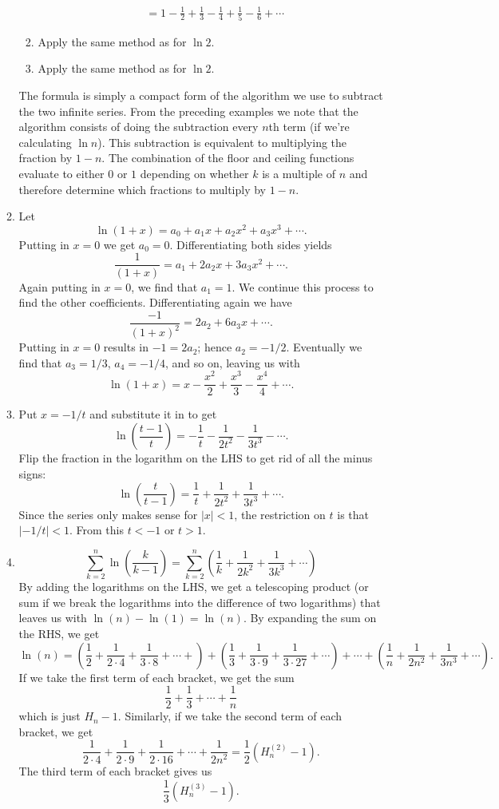 \documentclass[a4paper,10pt]{article}
\begin{document}
\begin{enumerate}
\begin{enumerate}
\begin{enumerate}
\[\begin{split}
                &=1-\frac{1}{2}+\frac{1}{3}-\frac{1}{4}+\frac{1}{5}-\frac{1}{6}+\cdots
        \end{split}
      \]
    \item Apply the same method as for \(\ln2\).
    \item Apply the same method as for \(\ln2\).
    \end{enumerate}
    The formula is simply a compact form of the algorithm we use to subtract the two infinite series. From the preceding examples
    we note that the algorithm consists of doing the subtraction every \(n\)th term (if we're calculating \(\ln n\)). This subtraction
    is equivalent to multiplying the fraction by \(1-n\). The combination of the floor and ceiling functions evaluate to either \(0\) or \(1\)
    depending on whether \(k\) is a multiple of \(n\) and therefore determine which fractions to multiply by \(1-n\).
  \item Let \[\ln(1+x)=a_0+a_1x+a_2x^2+a_3x^3+\cdots.\]
    Putting in \(x=0\) we get \(a_0=0\). Differentiating both sides yields \[\frac{1}{(1+x)}=a_1+2a_2x+3a_3x^2+\cdots.\]
    Again putting in \(x=0\), we find that \(a_1=1\). We continue this process to find the other coefficients. Differentiating again
    we have \[\frac{-1}{(1+x)^2}=2a_2+6a_3x+\cdots.\] Putting in \(x=0\) results in \(-1=2a_2\); hence \(a_2=-1/2\). Eventually
    we find that \(a_3=1/3\), \(a_4=-1/4\), and so on, leaving us with \[\ln(1+x)=x-\frac{x^2}{2}+\frac{x^3}{3}-\frac{x^4}{4}+\cdots.\]
  \item Put \(x=-1/t\) and substitute it in to get
    \[\ln\left(\frac{t-1}{t}\right)=-\frac{1}{t}-\frac{1}{2t^2}-\frac{1}{3t^3}-\cdots.\]
      Flip the fraction in the logarithm on the LHS to get rid of all the minus signs:
      \[\ln\left(\frac{t}{t-1}\right)=\frac{1}{t}+\frac{1}{2t^2}+\frac{1}{3t^3}+\cdots.\]
      Since the series only makes sense for \(|x|<1\), the restriction on \(t\) is that \(|-1/t|<1\). From this \(t<-1\) or \(t>1\).
    \item \[ \sum_{k=2}^{n}\ln\left(\frac{k}{k-1}\right)=\sum_{k=2}^n\left(\frac{1}{k}+\frac{1}{2k^2}+\frac{1}{3k^3}+\cdots\right)\]
          By adding the logarithms on the LHS, we get a telescoping product (or sum if we break the logarithms into the difference of two logarithms)
          that leaves us with \(\ln(n)-\ln(1)=\ln(n)\). By expanding the sum on the RHS,  we get
          \[\ln(n)=\left(\frac{1}{2}+\frac{1}{2\cdot4}+\frac{1}{3\cdot8}+\cdots+\right)+\left(\frac{1}{3}+\frac{1}{3\cdot9}+\frac{1}{3\cdot27}+\cdots\right)+\cdots+\left(\frac{1}{n}+\frac{1}{2n^2}+\frac{1}{3n^3}+\cdots\right).\]
          If we take the first term of each bracket, we get the sum
          \[\frac{1}{2}+\frac{1}{3}+\cdots+\frac{1}{n}\] which is just
          \(H_n-1\). Similarly, if we take the second term of each bracket,
          we get \[\frac{1}{2\cdot 4}+\frac{1}{2\cdot9}+\frac{1}{2\cdot16}+\cdots+\frac{1}{2n^2}=\frac{1}{2}(H^{(2)}_n-1).\]
          The third term of each bracket gives us \[\frac{1}{3}(H^{(3)}_n-1).\]
          

\end{enumerate}
\end{enumerate}
\end{document}
